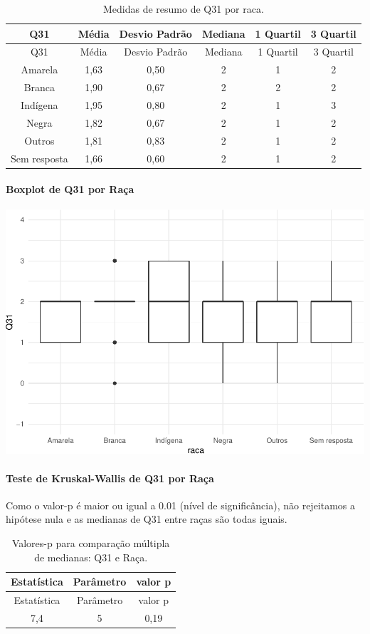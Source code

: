 \documentclass[]{article}
\let\oldparagraph\paragraph
\renewcommand{\paragraph}[1]{\oldparagraph{#1}\mbox{}}
\begin{document}
\begin{longtable}[]{@{}cccccc@{}}
\caption{\label{tab:unnamed-chunk-1050}Medidas de resumo de Q31 por raca.}\tabularnewline
\toprule
Q31 & Média & Desvio Padrão & Mediana & 1 Quartil & 3 Quartil\tabularnewline
\midrule
\endfirsthead
\toprule
Q31 & Média & Desvio Padrão & Mediana & 1 Quartil & 3 Quartil\tabularnewline
\midrule
\endhead
Amarela & 1,63 & 0,50 & 2 & 1 & 2\tabularnewline
Branca & 1,90 & 0,67 & 2 & 2 & 2\tabularnewline
Indígena & 1,95 & 0,80 & 2 & 1 & 3\tabularnewline
Negra & 1,82 & 0,67 & 2 & 1 & 2\tabularnewline
Outros & 1,81 & 0,83 & 2 & 1 & 2\tabularnewline
Sem resposta & 1,66 & 0,60 & 2 & 1 & 2\tabularnewline
\bottomrule
\end{longtable}

\hypertarget{boxplot-de-q31-por-rauxe7a}{%
\paragraph{Boxplot de Q31 por Raça}\label{boxplot-de-q31-por-rauxe7a}}

\begin{center}\includegraphics[width=0.75\linewidth]{relatorio_covid19_files/figure-latex/unnamed-chunk-1051-1} \end{center}

\hypertarget{teste-de-kruskal-wallis-de-q31-por-rauxe7a}{%
\paragraph{Teste de Kruskal-Wallis de Q31 por Raça}\label{teste-de-kruskal-wallis-de-q31-por-rauxe7a}}

Como o valor-p é maior ou igual a 0.01 (nível de significância), não rejeitamos a hipótese nula e as medianas de Q31 entre raças são todas iguais.

\begin{longtable}[]{@{}ccc@{}}
\caption{\label{tab:unnamed-chunk-1053}Valores-p para comparação múltipla de medianas: Q31 e Raça.}\tabularnewline
\toprule
Estatística & Parâmetro & valor p\tabularnewline
\midrule
\endfirsthead
\toprule
Estatística & Parâmetro & valor p\tabularnewline
\midrule
\endhead
7,4 & 5 & 0,19\tabularnewline
\bottomrule
\end{longtable}
\end{document}
